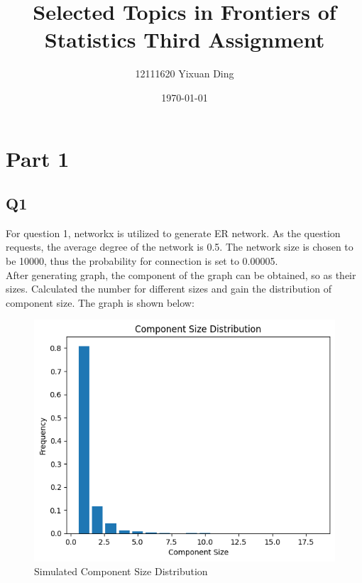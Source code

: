 \documentclass{article}
\begin{document}
	
	\title{Selected Topics in Frontiers of Statistics Third Assignment}
	\author{12111620 Yixuan Ding}
	\date{\today}
	\maketitle
	\section*{Part 1}
	\subsection*{Q1}
	For question 1, networkx is utilized to generate ER network. As the question requests, the average degree of the network is 0.5. The network size is chosen to be 10000, thus the probability for connection is set to 0.00005.\\
	After generating graph, the component of the graph can be obtained, so as their sizes. Calculated the number for different sizes and gain the distribution of component size. The graph is shown below:
	\begin{figure}[H]
		\centering
		\includegraphics[scale=0.5]{P1Q1.png}
		\caption{Simulated Component Size Distribution}
	\end{figure}
	
\end{document}

